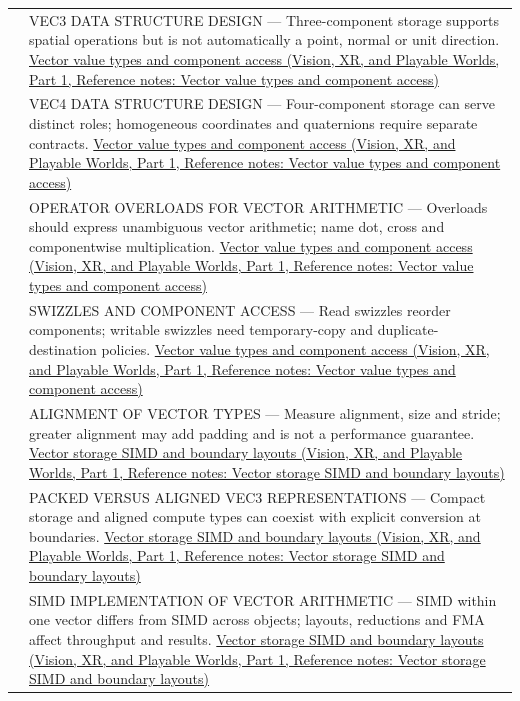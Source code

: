 {\begin{longtable}[]{@{}
  >{\raggedright\arraybackslash}p{}
  >{\raggedright\arraybackslash}p{}@{}}
589 & VEC3 DATA STRUCTURE DESIGN --- Three-component storage supports spatial operations but is not automatically a point, normal or unit direction. \href{../07-Vision-XR-and-Playable-Worlds-P01/main.pdf\#appendix-37a39984ba66}{Vector value types and component access (Vision, XR, and Playable Worlds, Part 1, Reference notes: Vector value types and component access)} \\
590 & VEC4 DATA STRUCTURE DESIGN --- Four-component storage can serve distinct roles; homogeneous coordinates and quaternions require separate contracts. \href{../07-Vision-XR-and-Playable-Worlds-P01/main.pdf\#appendix-37a39984ba66}{Vector value types and component access (Vision, XR, and Playable Worlds, Part 1, Reference notes: Vector value types and component access)} \\
591 & OPERATOR OVERLOADS FOR VECTOR ARITHMETIC --- Overloads should express unambiguous vector arithmetic; name dot, cross and componentwise multiplication. \href{../07-Vision-XR-and-Playable-Worlds-P01/main.pdf\#appendix-37a39984ba66}{Vector value types and component access (Vision, XR, and Playable Worlds, Part 1, Reference notes: Vector value types and component access)} \\
592 & SWIZZLES AND COMPONENT ACCESS --- Read swizzles reorder components; writable swizzles need temporary-copy and duplicate-destination policies. \href{../07-Vision-XR-and-Playable-Worlds-P01/main.pdf\#appendix-37a39984ba66}{Vector value types and component access (Vision, XR, and Playable Worlds, Part 1, Reference notes: Vector value types and component access)} \\
593 & ALIGNMENT OF VECTOR TYPES --- Measure alignment, size and stride; greater alignment may add padding and is not a performance guarantee. \href{../07-Vision-XR-and-Playable-Worlds-P01/main.pdf\#appendix-26bf6bf2fb8b}{Vector storage SIMD and boundary layouts (Vision, XR, and Playable Worlds, Part 1, Reference notes: Vector storage SIMD and boundary layouts)} \\
594 & PACKED VERSUS ALIGNED VEC3 REPRESENTATIONS --- Compact storage and aligned compute types can coexist with explicit conversion at boundaries. \href{../07-Vision-XR-and-Playable-Worlds-P01/main.pdf\#appendix-26bf6bf2fb8b}{Vector storage SIMD and boundary layouts (Vision, XR, and Playable Worlds, Part 1, Reference notes: Vector storage SIMD and boundary layouts)} \\
595 & SIMD IMPLEMENTATION OF VECTOR ARITHMETIC --- SIMD within one vector differs from SIMD across objects; layouts, reductions and FMA affect throughput and results. \href{../07-Vision-XR-and-Playable-Worlds-P01/main.pdf\#appendix-26bf6bf2fb8b}{Vector storage SIMD and boundary layouts (Vision, XR, and Playable Worlds, Part 1, Reference notes: Vector storage SIMD and boundary layouts)} \\

\end{longtable}}
